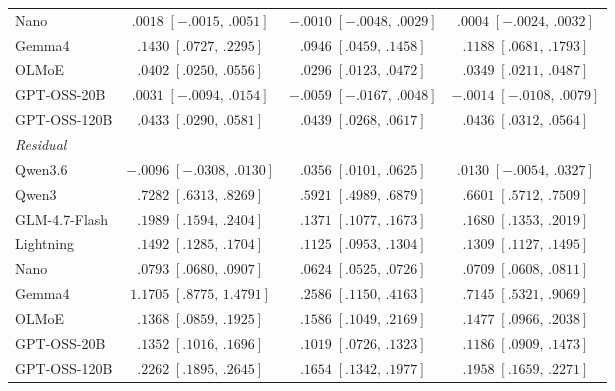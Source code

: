 \begin{tabular*}{\linewidth}{@{\extracolsep{\fill}}lccc@{}}
Nano & \(.0018\;[-.0015,\,.0051]\) & \(-.0010\;[-.0048,\,.0029]\) & \(.0004\;[-.0024,\,.0032]\)\\[1pt]
Gemma4 & \(.1430\;[.0727,\,.2295]\) & \(.0946\;[.0459,\,.1458]\) & \(.1188\;[.0681,\,.1793]\)\\[1pt]
OLMoE & \(.0402\;[.0250,\,.0556]\) & \(.0296\;[.0123,\,.0472]\) & \(.0349\;[.0211,\,.0487]\)\\[1pt]
GPT-OSS-20B & \(.0031\;[-.0094,\,.0154]\) & \(-.0059\;[-.0167,\,.0048]\) & \(-.0014\;[-.0108,\,.0079]\)\\[1pt]
GPT-OSS-120B & \(.0433\;[.0290,\,.0581]\) & \(.0439\;[.0268,\,.0617]\) & \(.0436\;[.0312,\,.0564]\)\\[1pt]
\midrule
\multicolumn{4}{l}{\textit{Residual}} \\[1pt]
Qwen3.6 & \(-.0096\;[-.0308,\,.0130]\) & \(.0356\;[.0101,\,.0625]\) & \(.0130\;[-.0054,\,.0327]\)\\[1pt]
Qwen3 & \(.7282\;[.6313,\,.8269]\) & \(.5921\;[.4989,\,.6879]\) & \(.6601\;[.5712,\,.7509]\)\\[1pt]
GLM-4.7-Flash & \(.1989\;[.1594,\,.2404]\) & \(.1371\;[.1077,\,.1673]\) & \(.1680\;[.1353,\,.2019]\)\\[1pt]
Lightning & \(.1492\;[.1285,\,.1704]\) & \(.1125\;[.0953,\,.1304]\) & \(.1309\;[.1127,\,.1495]\)\\[1pt]
Nano & \(.0793\;[.0680,\,.0907]\) & \(.0624\;[.0525,\,.0726]\) & \(.0709\;[.0608,\,.0811]\)\\[1pt]
Gemma4 & \(1.1705\;[.8775,\,1.4791]\) & \(.2586\;[.1150,\,.4163]\) & \(.7145\;[.5321,\,.9069]\)\\[1pt]
OLMoE & \(.1368\;[.0859,\,.1925]\) & \(.1586\;[.1049,\,.2169]\) & \(.1477\;[.0966,\,.2038]\)\\[1pt]
GPT-OSS-20B & \(.1352\;[.1016,\,.1696]\) & \(.1019\;[.0726,\,.1323]\) & \(.1186\;[.0909,\,.1473]\)\\[1pt]
GPT-OSS-120B & \(.2262\;[.1895,\,.2645]\) & \(.1654\;[.1342,\,.1977]\) & \(.1958\;[.1659,\,.2271]\)\\[1pt]
\bottomrule
\end{tabular*}
\endgroup
